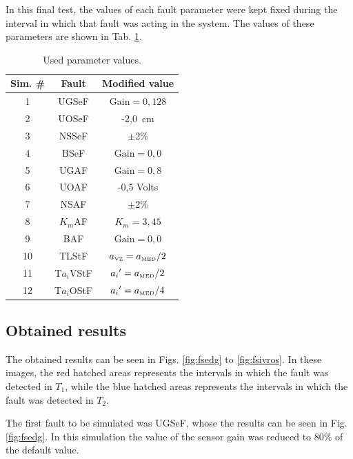 \documentclass[10pt,fleqn,a4paper]{article}
\begin{document}
In this final test, the values of each fault parameter were kept fixed during
the interval in which that fault was acting in the system. The values of these
parameters are shown in Tab. \ref{tab:used_val}.

\begin{table}[htb]
\centering
\caption{Used parameter values.}
\label{tab:used_val}
\begin{tabular}{|c|c|c|}
\hline
{\bf Sim. \#} & {\bf Fault} & {\bf Modified value}\\
\hline
1 & UGSeF & $\text{Gain} = 0,128$\\
\hline
2 & UOSeF & -2,0\ cm\\
\hline
3 & NSSeF & $\pm$2\%\\
\hline
4 & BSeF & $\text{Gain} = 0,0$\\
\hline
5 & UGAF & $\text{Gain} = 0,8$\\
\hline
6 & UOAF & -0,5 Volts\\
\hline
7 & NSAF & $\pm$2\%\\
\hline
8 & $K_m$AF & $K_m = 3,45$\\ 
\hline
9 & BAF & $\text{Gain} = 0,0$\\
\hline
10 & TLStF & $a_{\text{\tiny VZ}} = a_{\text{\tiny MED}}/2$\\
\hline
11 & T$a_i$VStF & ${a_i}' = a_{\text{\tiny MED}}/2$\\
\hline
12 & T$a_i$OStF & ${a_i}' = a_{\text{\tiny MED}}/4$\\
\hline
\end{tabular}
\end{table}

\subsection{Obtained results}
The obtained results can be seen in Figs. \ref{fig:fsedg} to \ref{fig:fsivros}.
In these images, the red hatched areas represents the intervals in which the
fault was detected in $T_1$, while the blue hatched areas represents the
intervals in which the fault was detected in $T_2$.

The first fault to be simulated was UGSeF, whose the results can be seen in Fig.
\ref{fig:fsedg}. In this simulation the value of the sensor gain was reduced to
80\% of the default value.
\end{document}
